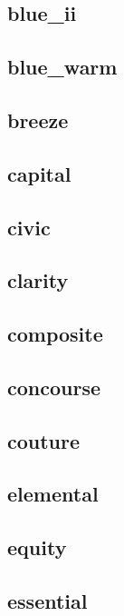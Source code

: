 \subsection{\ttfamily blue\_ii}
\newpage
\subsection{\ttfamily blue\_warm}
\newpage
\subsection{\ttfamily breeze}
\newpage
\subsection{\ttfamily capital}
\newpage
\subsection{\ttfamily civic}
\newpage
\subsection{\ttfamily clarity}
\newpage
\subsection{\ttfamily composite}
\newpage
\subsection{\ttfamily concourse}
\newpage
\subsection{\ttfamily couture}
\newpage
\subsection{\ttfamily elemental}
\newpage
\subsection{\ttfamily equity}
\newpage
\subsection{\ttfamily essential}
\newpage
